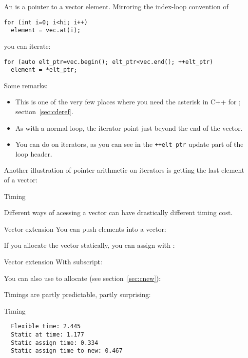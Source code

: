 An  is a pointer to a vector element. Mirroring
the index-loop convention of
\begin{verbatim}
for (int i=0; i<hi; i++)
  element = vec.at(i);
\end{verbatim}
you can iterate:
\begin{verbatim}
for (auto elt_ptr=vec.begin(); elt_ptr<vec.end(); ++elt_ptr)
  element = *elt_ptr;
\end{verbatim}
Some remarks:
\begin{itemize}
\item This is one of the very few places where you need the asterisk in C++
  for ; section~\ref{sec:cderef}.
\item As with a normal loop, the  iterator point just beyond the end
  of the vector.
\item You can do  on iterators, as
  you can see in the \verb-++elt_ptr- update part of the loop header.
\end{itemize}
Another illustration of pointer arithmetic on iterators is getting the
last element of a vector:
%

 {Timing}

Different ways of acessing a vector can have drastically different
timing cost.

\begin{block}{Vector extension}
  \label{sl:vect-extend-code}
  You can push elements into a vector:

  If you allocate the vector statically, you can assign with :
\end{block}

\begin{block}{Vector extension}
  \label{sl:vect-extend-code2}
  With subscript:

  You can also use  to allocate (see section~\ref{sec:cnew}):
\end{block}

Timings are partly predictable, partly surprising:
\begin{block}{Timing}
  \label{sl:vector-extend-time}
\begin{verbatim}
  Flexible time: 2.445
  Static at time: 1.177
  Static assign time: 0.334
  Static assign time to new: 0.467
\end{verbatim}
\end{block}

